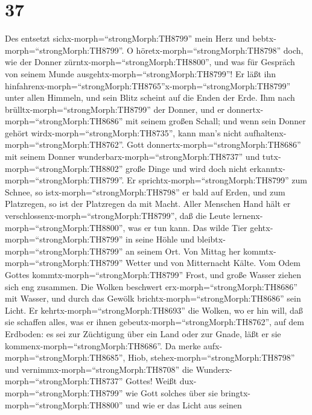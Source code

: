 \hypertarget{section-36}{%
\section{37}\label{section-36}}

 Des entsetzt sichx-morph=``strongMorph:TH8799'' mein Herz
und bebtx-morph=``strongMorph:TH8799''.  O
höretx-morph=``strongMorph:TH8798'' doch, wie der Donner
zürntx-morph=``strongMorph:TH8800'', und was für Gespräch von seinem
Munde ausgehtx-morph=``strongMorph:TH8799''!  Er läßt ihn
hinfahrenx-morph=``strongMorph:TH8765''x-morph=``strongMorph:TH8799''
unter allen Himmeln, und sein Blitz scheint auf die Enden der Erde.
 Ihm nach brülltx-morph=``strongMorph:TH8799'' der Donner,
und er donnertx-morph=``strongMorph:TH8686'' mit seinem großen Schall;
und wenn sein Donner gehört wirdx-morph=``strongMorph:TH8735'', kann
man's nicht aufhaltenx-morph=``strongMorph:TH8762''.  Gott
donnertx-morph=``strongMorph:TH8686'' mit seinem Donner
wunderbarx-morph=``strongMorph:TH8737'' und
tutx-morph=``strongMorph:TH8802'' große Dinge und wird doch nicht
erkanntx-morph=``strongMorph:TH8799''.  Er
sprichtx-morph=``strongMorph:TH8799'' zum Schnee, so
istx-morph=``strongMorph:TH8798'' er bald auf Erden, und zum Platzregen,
so ist der Platzregen da mit Macht.  Aller Menschen Hand
hält er verschlossenx-morph=``strongMorph:TH8799'', daß die Leute
lernenx-morph=``strongMorph:TH8800'', was er tun kann.  Das
wilde Tier gehtx-morph=``strongMorph:TH8799'' in seine Höhle und
bleibtx-morph=``strongMorph:TH8799'' an seinem Ort.  Von
Mittag her kommtx-morph=``strongMorph:TH8799'' Wetter und von
Mitternacht Kälte.  Vom Odem Gottes
kommtx-morph=``strongMorph:TH8799'' Frost, und große Wasser ziehen sich
eng zusammen.  Die Wolken beschwert
erx-morph=``strongMorph:TH8686'' mit Wasser, und durch das Gewölk
brichtx-morph=``strongMorph:TH8686'' sein Licht.  Er
kehrtx-morph=``strongMorph:TH8693'' die Wolken, wo er hin will, daß sie
schaffen alles, was er ihnen gebeutx-morph=``strongMorph:TH8762'', auf
dem Erdboden:  es sei zur Züchtigung über ein Land oder zur
Gnade, läßt er sie kommenx-morph=``strongMorph:TH8686''. 
Da merke aufx-morph=``strongMorph:TH8685'', Hiob,
stehex-morph=``strongMorph:TH8798'' und
vernimmx-morph=``strongMorph:TH8708'' die
Wunderx-morph=``strongMorph:TH8737'' Gottes!  Weißt
dux-morph=``strongMorph:TH8799'' wie Gott solches über sie
bringtx-morph=``strongMorph:TH8800'' und wie er das Licht aus seinen
